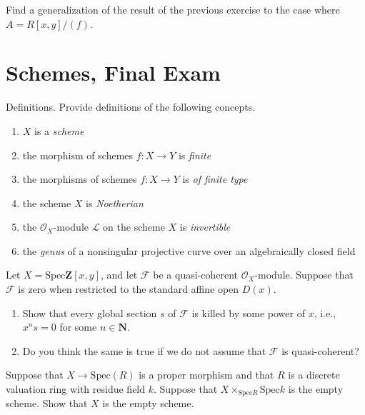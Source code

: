\begin{exercise}
Find a generalization
of the result of the previous exercise to the case where $A=R[x,y]/(f)$.
\end{exercise}

\section{Schemes, Final Exam}
\label{section-final-exam}

\begin{exercise}
Definitions. Provide definitions of the following concepts.
\begin{enumerate}
\item $X$ is a {\it scheme} 
\item the morphism of schemes $f : X \to Y$ is {\it finite}
\item the morphisms of schemes $f : X \to Y$ is {\it of finite type}
\item the scheme $X$ is {\it Noetherian}
\item the ${\mathcal O}_X$-module ${\mathcal L}$ on
the scheme $X$ is {\it invertible}
\item the {\it genus} of a nonsingular
projective curve over an algebraically closed field
\end{enumerate}
\end{exercise}

\begin{exercise}
Let $X = \text{Spec} {\mathbf Z}[x,y]$, and let ${\mathcal F}$ be a quasi-coherent
${\mathcal O}_X$-module. Suppose that ${\mathcal F}$ is zero when restricted to the
standard affine open $D(x)$.
\begin{enumerate}
\item Show that every global section $s$ of ${\mathcal F}$ is killed by some
power of $x$, i.e., $x^ns=0$ for some $n\in {\mathbf N}$.
\item Do you think the same is true if we do not assume that ${\mathcal F}$
is quasi-coherent?
\end{enumerate}
\end{exercise}

\begin{exercise}
Suppose that $X \to \text{Spec}(R)$ is a proper morphism and that
$R$ is a discrete valuation ring with residue field $k$. Suppose that
$X \times_{\text{Spec} R} \text{Spec} k$ is the empty scheme. Show that
$X$ is the empty scheme.
\end{exercise}

